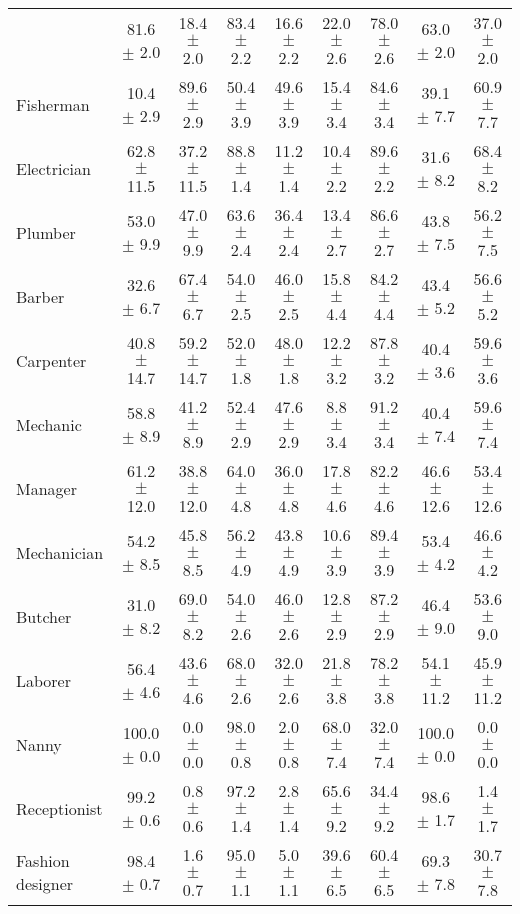 \begin{table*}[p]
{\begin{tabular}{l|cc|cc|cc|cc}
& 81.6 $\pm$ 2.0 & 18.4 $\pm$ 2.0
& 83.4 $\pm$ 2.2 & 16.6 $\pm$ 2.2
& 22.0 $\pm$ 2.6 & 78.0 $\pm$ 2.6
& 63.0 $\pm$ 2.0 & 37.0 $\pm$ 2.0
\\
Fisherman
& 10.4 $\pm$ 2.9 & 89.6 $\pm$ 2.9
& 50.4 $\pm$ 3.9 & 49.6 $\pm$ 3.9
& 15.4 $\pm$ 3.4 & 84.6 $\pm$ 3.4
& 39.1 $\pm$ 7.7 & 60.9 $\pm$ 7.7
\\
Electrician
& 62.8 $\pm$ 11.5 & 37.2 $\pm$ 11.5
& 88.8 $\pm$ 1.4 & 11.2 $\pm$ 1.4
& 10.4 $\pm$ 2.2 & 89.6 $\pm$ 2.2
& 31.6 $\pm$ 8.2 & 68.4 $\pm$ 8.2
\\
Plumber
& 53.0 $\pm$ 9.9 & 47.0 $\pm$ 9.9
& 63.6 $\pm$ 2.4 & 36.4 $\pm$ 2.4
& 13.4 $\pm$ 2.7 & 86.6 $\pm$ 2.7
& 43.8 $\pm$ 7.5 & 56.2 $\pm$ 7.5
\\
Barber
& 32.6 $\pm$ 6.7 & 67.4 $\pm$ 6.7
& 54.0 $\pm$ 2.5 & 46.0 $\pm$ 2.5
& 15.8 $\pm$ 4.4 & 84.2 $\pm$ 4.4
& 43.4 $\pm$ 5.2 & 56.6 $\pm$ 5.2
\\
Carpenter
& 40.8 $\pm$ 14.7 & 59.2 $\pm$ 14.7
& 52.0 $\pm$ 1.8 & 48.0 $\pm$ 1.8
& 12.2 $\pm$ 3.2 & 87.8 $\pm$ 3.2
& 40.4 $\pm$ 3.6 & 59.6 $\pm$ 3.6
\\
Mechanic
& 58.8 $\pm$ 8.9 & 41.2 $\pm$ 8.9
& 52.4 $\pm$ 2.9 & 47.6 $\pm$ 2.9
& 8.8 $\pm$ 3.4 & 91.2 $\pm$ 3.4
& 40.4 $\pm$ 7.4 & 59.6 $\pm$ 7.4
\\
Manager
& 61.2 $\pm$ 12.0 & 38.8 $\pm$ 12.0
& 64.0 $\pm$ 4.8 & 36.0 $\pm$ 4.8
& 17.8 $\pm$ 4.6 & 82.2 $\pm$ 4.6
& 46.6 $\pm$ 12.6 & 53.4 $\pm$ 12.6
\\
Mechanician
& 54.2 $\pm$ 8.5 & 45.8 $\pm$ 8.5
& 56.2 $\pm$ 4.9 & 43.8 $\pm$ 4.9
& 10.6 $\pm$ 3.9 & 89.4 $\pm$ 3.9
& 53.4 $\pm$ 4.2 & 46.6 $\pm$ 4.2
\\
Butcher
& 31.0 $\pm$ 8.2 & 69.0 $\pm$ 8.2
& 54.0 $\pm$ 2.6 & 46.0 $\pm$ 2.6
& 12.8 $\pm$ 2.9 & 87.2 $\pm$ 2.9
& 46.4 $\pm$ 9.0 & 53.6 $\pm$ 9.0
\\
Laborer
& 56.4 $\pm$ 4.6 & 43.6 $\pm$ 4.6
& 68.0 $\pm$ 2.6 & 32.0 $\pm$ 2.6
& 21.8 $\pm$ 3.8 & 78.2 $\pm$ 3.8
& 54.1 $\pm$ 11.2 & 45.9 $\pm$ 11.2
\\
Nanny
& 100.0 $\pm$ 0.0 & 0.0 $\pm$ 0.0
& 98.0 $\pm$ 0.8 & 2.0 $\pm$ 0.8
& 68.0 $\pm$ 7.4 & 32.0 $\pm$ 7.4
& 100.0 $\pm$ 0.0 & 0.0 $\pm$ 0.0
\\
Receptionist
& 99.2 $\pm$ 0.6 & 0.8 $\pm$ 0.6
& 97.2 $\pm$ 1.4 & 2.8 $\pm$ 1.4
& 65.6 $\pm$ 9.2 & 34.4 $\pm$ 9.2
& 98.6 $\pm$ 1.7 & 1.4 $\pm$ 1.7
\\
Fashion designer
& 98.4 $\pm$ 0.7 & 1.6 $\pm$ 0.7
& 95.0 $\pm$ 1.1 & 5.0 $\pm$ 1.1
& 39.6 $\pm$ 6.5 & 60.4 $\pm$ 6.5
& 69.3 $\pm$ 7.8 & 30.7 $\pm$ 7.8
\\

\end{tabular}}
\end{table*}
